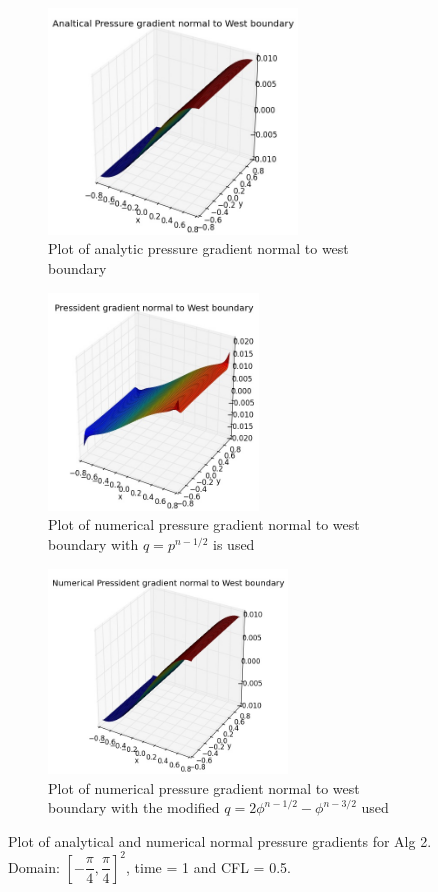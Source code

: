 \begin{figure}[H]
	\centering
	\begin{subfigure}[t]{2.6in}
		\centering
		\includegraphics[width=2.6in]{figures/Pm1b2_unf1_np_W_NPexgrad_t_1_grid_60.jpg}
		\caption{Plot of analytic pressure gradient normal to west boundary}\label{fig:6.17a}		
	\end{subfigure}
	\quad
	\begin{subfigure}[t]{2.2in}
		\centering
		\includegraphics[width=2.2in]{figures/Pm1b_unf1_np_W_Npf_t_1_grid_60.jpg}
		\caption{Plot of numerical pressure gradient normal to west boundary with $q = p^{n-1/2}$ is used}\label{fig:6.17b}
	\end{subfigure}
	\quad
	\centering
	\begin{subfigure}[t]{2.5in}
		\centering
		\includegraphics[width=2.5in]{figures/Pm1b2_unf1_np_W_Npf_t_1_grid_60.jpg}
		\caption{Plot of numerical pressure gradient normal to west boundary with the modified $q = 2\phi^{n-1/2} - \phi^{n-3/2}$ used}\label{fig:6.17b}		
	\end{subfigure}
	\caption{Plot of analytical and numerical normal pressure gradients for Alg 2. Domain: $[-\dfrac{\pi}{4}, \dfrac{\pi}{4}]^2$, time = 1 and CFL = 0.5.}\label{fig:6.17}
\end{figure}


